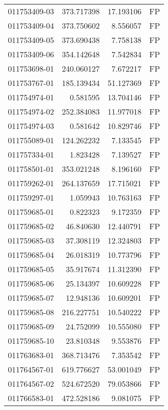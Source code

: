 \begin{tabular}{lrrl}
011753409-03 &  373.717398 &      17.193106 &   FP \\
011753409-04 &  373.750602 &       8.556057 &   FP \\
011753409-05 &  373.690438 &       7.758138 &   FP \\
011753409-06 &  354.142648 &       7.542834 &   FP \\
011753698-01 &  240.060127 &       7.672217 &   FP \\
011753767-01 &  185.139434 &      51.127369 &   FP \\
011754974-01 &    0.581595 &      13.704146 &   FP \\
011754974-02 &  252.384083 &      11.977018 &   FP \\
011754974-03 &    0.581642 &      10.829746 &   FP \\
011755089-01 &  124.262232 &       7.133545 &   FP \\
011757334-01 &    1.823428 &       7.139527 &   FP \\
011758501-01 &  353.021248 &       8.196160 &   FP \\
011759262-01 &  264.137659 &      17.715021 &   FP \\
011759297-01 &    1.059943 &      10.763163 &   FP \\
011759685-01 &    0.822323 &       9.172359 &   FP \\
011759685-02 &   46.840630 &      12.440791 &   FP \\
011759685-03 &   37.308119 &      12.324803 &   FP \\
011759685-04 &   26.018319 &      10.773796 &   FP \\
011759685-05 &   35.917674 &      11.312390 &   FP \\
011759685-06 &   25.134397 &      10.609228 &   FP \\
011759685-07 &   12.948136 &      10.609201 &   FP \\
011759685-08 &  216.227751 &      10.540222 &   FP \\
011759685-09 &   24.752099 &      10.555080 &   FP \\
011759685-10 &   23.810348 &       9.553876 &   FP \\
011763683-01 &  368.713476 &       7.353542 &   FP \\
011764567-01 &  619.776627 &      53.001049 &   FP \\
011764567-02 &  524.672520 &      79.053866 &   FP \\
011766583-01 &  472.528186 &       9.081075 &   FP \\

\end{tabular}
